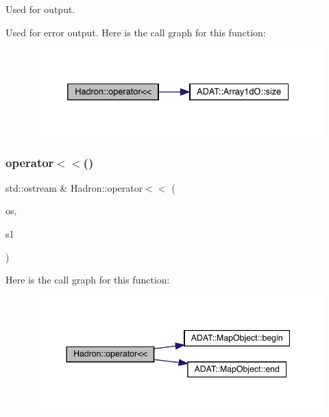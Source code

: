 Used for output. 

Used for error output. Here is the call graph for this function\+:
\nopagebreak
\begin{figure}[H]
\begin{center}
\leavevmode
\includegraphics[width=332pt]{d1/daf/namespaceHadron_a243db37c66ec71b086f54a64d62fa659_cgraph}
\end{center}
\end{figure}
\mbox{\label{namespaceHadron_af9e168289a71f406cf53d10783cc513c}} 
\subsubsection{\texorpdfstring{operator$<$$<$()}{operator<<()}\hspace{0.1cm}{\footnotesize\ttfamily [41/48]}}
{\footnotesize\ttfamily std\+::ostream \& Hadron\+::operator$<$$<$ (\begin{DoxyParamCaption}\item[{std\+::ostream \&}]{os,  }\item[{const \mbox{\hyperlink{namespaceHadron_a22279e56b59508dc8dd2c8991dc911fd}{Map\+Single\+Hadron\+Quark\+Spin\+\_\+t}} \&}]{s1 }\end{DoxyParamCaption})}

Here is the call graph for this function\+:
\nopagebreak
\begin{figure}[H]
\begin{center}
\leavevmode
\includegraphics[width=344pt]{d1/daf/namespaceHadron_af9e168289a71f406cf53d10783cc513c_cgraph}
\end{center}
\end{figure}
\mbox{\label{namespaceHadron_af6547a2cdd6369eda030067e469096bf}} 
